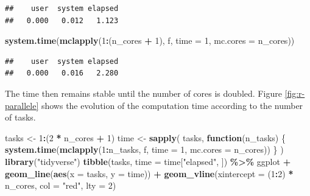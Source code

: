 \documentclass[
  12pt,
  american,
  a4paper,
  extrafontsizes,onecolumn,openright
  ]{memoir}
\newenvironment{Shaded}{\begin{snugshade}}{\end{snugshade}}
\newcommand{\AttributeTok}[1]{\textcolor[rgb]{0.13,0.29,0.53}{#1}}
\newcommand{\ControlFlowTok}[1]{\textcolor[rgb]{0.13,0.29,0.53}{\textbf{#1}}}
\newcommand{\DecValTok}[1]{\textcolor[rgb]{0.00,0.00,0.81}{#1}}
\newcommand{\FunctionTok}[1]{\textcolor[rgb]{0.13,0.29,0.53}{\textbf{#1}}}
\newcommand{\NormalTok}[1]{#1}
\newcommand{\OtherTok}[1]{\textcolor[rgb]{0.56,0.35,0.01}{#1}}
\newcommand{\SpecialCharTok}[1]{\textcolor[rgb]{0.81,0.36,0.00}{\textbf{#1}}}
\newcommand{\StringTok}[1]{\textcolor[rgb]{0.31,0.60,0.02}{#1}}
\begin{document}
\begin{verbatim}
##    user  system elapsed 
##   0.000   0.012   1.123
\end{verbatim}

\begin{Shaded}
\begin{Highlighting}[]
\FunctionTok{system.time}\NormalTok{(}\FunctionTok{mclapply}\NormalTok{(}\DecValTok{1}\SpecialCharTok{:}\NormalTok{(n\_cores }\SpecialCharTok{+} \DecValTok{1}\NormalTok{), f, }\AttributeTok{time =} \DecValTok{1}\NormalTok{, }\AttributeTok{mc.cores =}\NormalTok{ n\_cores))}
\end{Highlighting}
\end{Shaded}

\begin{verbatim}
##    user  system elapsed 
##   0.000   0.016   2.280
\end{verbatim}

\normalsize

The time then remains stable until the number of cores is doubled.
Figure \ref{fig:r-parallele} shows the evolution of the computation time according to the number of tasks.



\scriptsize

\begin{Shaded}
\begin{Highlighting}[]
\NormalTok{tasks }\OtherTok{\textless{}{-}} \DecValTok{1}\SpecialCharTok{:}\NormalTok{(}\DecValTok{2} \SpecialCharTok{*}\NormalTok{ n\_cores }\SpecialCharTok{+} \DecValTok{1}\NormalTok{)}
\NormalTok{time }\OtherTok{\textless{}{-}} \FunctionTok{sapply}\NormalTok{(}
\NormalTok{  tasks, }
  \ControlFlowTok{function}\NormalTok{(n\_tasks) \{}
    \FunctionTok{system.time}\NormalTok{(}\FunctionTok{mclapply}\NormalTok{(}\DecValTok{1}\SpecialCharTok{:}\NormalTok{n\_tasks, f, }\AttributeTok{time =} \DecValTok{1}\NormalTok{, }\AttributeTok{mc.cores =}\NormalTok{ n\_cores))}
\NormalTok{  \}}
\NormalTok{)}
\FunctionTok{library}\NormalTok{(}\StringTok{"tidyverse"}\NormalTok{)}
\FunctionTok{tibble}\NormalTok{(tasks, }\AttributeTok{time =}\NormalTok{ time[}\StringTok{"elapsed"}\NormalTok{, ]) }\SpecialCharTok{\%\textgreater{}\%} 
\NormalTok{  ggplot }\SpecialCharTok{+}
  \FunctionTok{geom\_line}\NormalTok{(}\FunctionTok{aes}\NormalTok{(}\AttributeTok{x =}\NormalTok{ tasks, }\AttributeTok{y =}\NormalTok{ time)) }\SpecialCharTok{+}
  \FunctionTok{geom\_vline}\NormalTok{(}\AttributeTok{xintercept =}\NormalTok{ (}\DecValTok{1}\SpecialCharTok{:}\DecValTok{2}\NormalTok{) }\SpecialCharTok{*}\NormalTok{ n\_cores, }\AttributeTok{col =} \StringTok{"red"}\NormalTok{, }\AttributeTok{lty =} \DecValTok{2}\NormalTok{)}
\end{Highlighting}
\end{Shaded}
\end{document}
